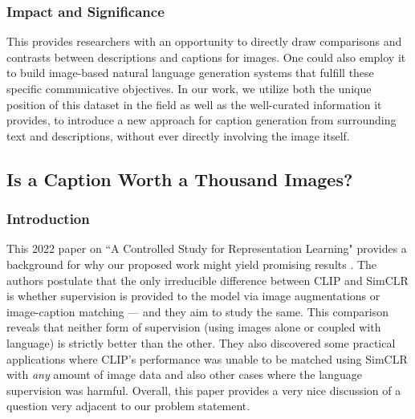 \documentclass[11pt]{article}
\begin{document}
\subsubsection{Impact and Significance}

This provides researchers with an opportunity to directly draw comparisons and contrasts between descriptions and captions for images. One could also employ it to build image-based natural language generation systems that fulfill these specific communicative objectives. In our work, we utilize both the unique position of this dataset in the field as well as the well-curated information it provides, to introduce a new approach for caption generation from surrounding text and descriptions, without ever directly involving the image itself.

\subsection{Is a Caption Worth a Thousand Images?}\label{sec:concadia}

\subsubsection{Introduction}
This 2022 paper on ``A Controlled Study for Representation Learning" provides a background for why our proposed work might yield promising results \cite{santurkar2022caption}. The authors postulate that the only irreducible difference between CLIP \cite{radford2021learning} and SimCLR \citep{chen2020simple} is whether supervision is provided to the model via image augmentations or image-caption matching {---} and they aim to study the same. This comparison reveals that neither form of supervision (using images alone or coupled with language) is strictly better than the other. They also discovered some practical applications where CLIP's performance was unable to be matched using SimCLR with \textit{any} amount of image data and also other cases where the language supervision was harmful. Overall, this paper provides a very nice discussion of a question very adjacent to our problem statement.
\end{document}
